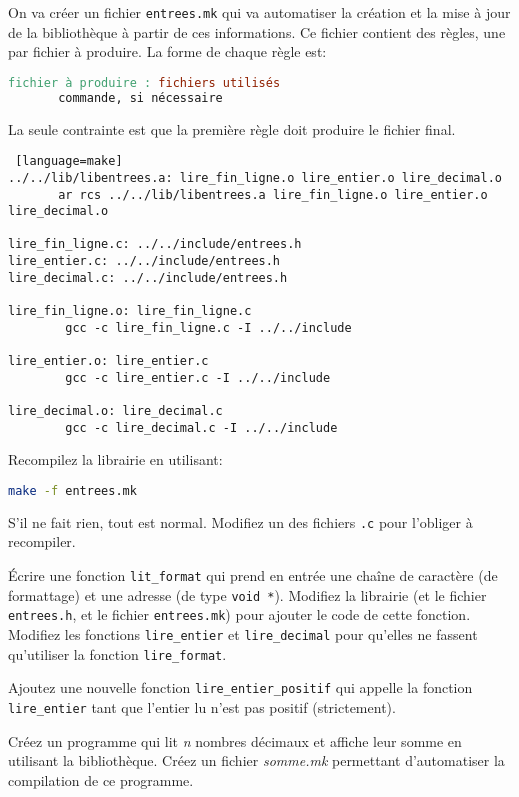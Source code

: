 \question On va créer un fichier \texttt{entrees.mk} qui va
automatiser la création et la mise à jour de la bibliothèque à partir
de ces informations. Ce fichier contient des règles, une par fichier à
produire. La forme de chaque règle est:
\begin{lstlisting}[language=make]
fichier à produire : fichiers utilisés
       commande, si nécessaire
\end{lstlisting}
La seule contrainte est que la première règle doit produire le fichier final.

\begin{solution}
  \begin{lstlisting} [language=make]
../../lib/libentrees.a: lire_fin_ligne.o lire_entier.o lire_decimal.o
       ar rcs ../../lib/libentrees.a lire_fin_ligne.o lire_entier.o lire_decimal.o

lire_fin_ligne.c: ../../include/entrees.h   
lire_entier.c: ../../include/entrees.h   
lire_decimal.c: ../../include/entrees.h

lire_fin_ligne.o: lire_fin_ligne.c
        gcc -c lire_fin_ligne.c -I ../../include

lire_entier.o: lire_entier.c
        gcc -c lire_entier.c -I ../../include

lire_decimal.o: lire_decimal.c
        gcc -c lire_decimal.c -I ../../include
  \end{lstlisting}
\end{solution}

\question Recompilez la librairie en utilisant:
\begin{lstlisting}[language=bash]
  make -f entrees.mk
\end{lstlisting}

\begin{solution}
  S'il ne fait rien, tout est normal. Modifiez un des fichiers
  \texttt{.c} pour l'obliger à recompiler.
\end{solution}

\question Écrire une fonction \texttt{lit\_format} qui prend en entrée
une chaîne de caractère (de formattage) et une adresse (de type
\texttt{void *}). Modifiez la librairie (et le fichier
\texttt{entrees.h}, et le fichier \texttt{entrees.mk}) pour ajouter le
code de cette fonction. Modifiez les fonctions \texttt{lire\_entier}
et \texttt{lire\_decimal} pour qu'elles ne fassent qu'utiliser la
fonction \texttt{lire\_format}.

\question Ajoutez une nouvelle fonction \texttt{lire\_entier\_positif}
qui appelle la fonction \texttt{lire\_entier} tant que l'entier lu
n'est pas positif (strictement).

\question Créez un programme qui lit \emph{n} nombres décimaux et
affiche leur somme en utilisant la bibliothèque. Créez un fichier
\emph{somme.mk} permettant d'automatiser la compilation de ce
programme.
